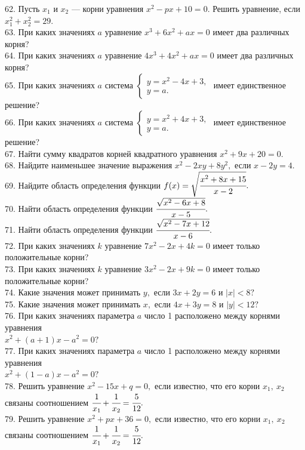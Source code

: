 \documentclass[12pt]{article}
\begin{document}
62. Пусть $x_1$ и $x_2$ --- корни уравнения $x^2-px+10=0.$ Решить уравнение, если $x_1^2+x_2^2=29.$\\
63. При каких значениях $a$ уравнение $x^3+6x^2+ax=0$ имеет два различных корня?\\
64. При каких значениях $a$ уравнение $4x^3+4x^2+ax=0$ имеет два различных корня?\\
65. При каких значениях $a$ система $\begin{cases} y=x^2-4x+3,\\ y=a.\end{cases}$ имеет единственное решение?\\
66. При каких значениях $a$ система $\begin{cases} y=x^2+4x+3,\\ y=a.\end{cases}$ имеет единственное решение?\\
67. Найти сумму квадратов корней квадратного уравнения $x^2+9x+20=0.$\\
68. Найдите наименьшее значение выражения $x^2-2xy+8y^2,$ если $x-2y=4.$\\
69. Найдите область определения функции $f(x)=\sqrt{\cfrac{x^2+8x+15}{x-2}}.$\\
70. Найти область определения функции $\cfrac{\sqrt{x^2-6x+8}}{x-5}.$\\
71. Найти область определения функции $\cfrac{\sqrt{x^2-7x+12}}{x-6}.$\\
72. При каких значениях $k$ уравнение $7x^2-2x+4k=0$ имеет только положительные корни?\\
73. При каких значениях $k$ уравнение $3x^2-2x+9k=0$ имеет только положительные корни?\\
74. Какие значения может принимать $y,$ если $3x+2y=6$ и $|x|<8?$\\
75. Какие значения может принимать $x,$ если $4x+3y=8$ и $|y|<12?$\\
76. При каких значениях параметра $a$ число 1 расположено между корнями уравнения \\$x^2+(a+1)x-a^2=0?$\\
77. При каких значениях параметра $a$ число 1 расположено между корнями уравнения \\$x^2+(1-a)x-a^2=0?$\\
78. Решить уравнение $x^2-15x+q=0,$ если известно, что его корни $x_1,\ x_2$ связаны соотношением $\cfrac{1}{x_1}+\cfrac{1}{x_2}=\cfrac{5}{12}.$\\
79. Решить уравнение $x^2+px+36=0,$ если известно, что его корни $x_1,\ x_2$ связаны соотношением $\cfrac{1}{x_1}+\cfrac{1}{x_2}=\cfrac{5}{12}.$\\
\end{document}
